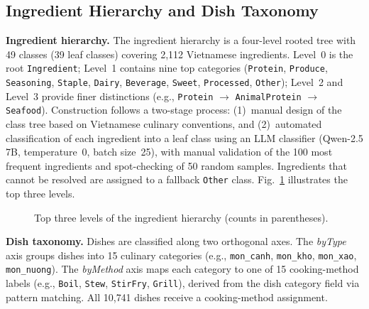 \subsection{Ingredient Hierarchy and Dish Taxonomy}
\label{ssec:hierarchy}

\textbf{Ingredient hierarchy.}
The ingredient hierarchy is a four-level rooted tree with 49 classes (39 leaf classes) covering 2{,}112 Vietnamese ingredients. Level~0 is the root \texttt{Ingredient}; Level~1 contains nine top categories (\texttt{Protein}, \texttt{Produce}, \texttt{Seasoning}, \texttt{Staple}, \texttt{Dairy}, \texttt{Beverage}, \texttt{Sweet}, \texttt{Processed}, \texttt{Other}); Level~2 and Level~3 provide finer distinctions (e.g., \texttt{Protein} $\to$ \texttt{AnimalProtein} $\to$ \texttt{Seafood}). Construction follows a two-stage process: (1)~manual design of the class tree based on Vietnamese culinary conventions, and (2)~automated classification of each ingredient into a leaf class using an LLM classifier (Qwen-2.5 7B, temperature~0, batch size~25), with manual validation of the 100 most frequent ingredients and spot-checking of 50 random samples. Ingredients that cannot be resolved are assigned to a fallback \texttt{Other} class. Fig.~\ref{fig:hierarchy} illustrates the top three levels.

\begin{figure}[t]
\centering
\caption{Top three levels of the ingredient hierarchy (counts in parentheses).}
\label{fig:hierarchy}
\end{figure}

\textbf{Dish taxonomy.}
Dishes are classified along two orthogonal axes. The \emph{byType} axis groups dishes into 15 culinary categories (e.g., \texttt{mon\_canh}, \texttt{mon\_kho}, \texttt{mon\_xao}, \texttt{mon\_nuong}). The \emph{byMethod} axis maps each category to one of 15 cooking-method labels (e.g., \texttt{Boil}, \texttt{Stew}, \texttt{StirFry}, \texttt{Grill}), derived from the dish category field via pattern matching. All 10{,}741 dishes receive a cooking-method assignment.

